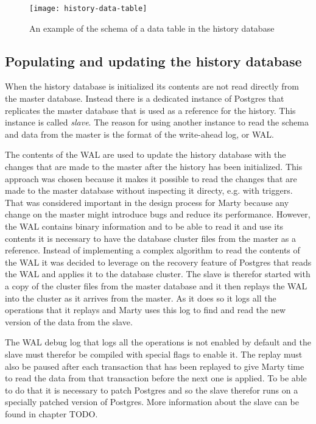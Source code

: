\begin{figure}[h!]
  \centering
    \texttt{[image: history-data-table]}
  \caption{An example of the schema of a data table in the history database}
  \label{history-data-table}
\end{figure}

\subsection{Populating and updating the history database}
When the history database is initialized its contents are not read directly from the master database.
Instead there is a dedicated instance of Postgres that replicates the master database that is used as a reference for the history.
This instance is called \textit{slave}.
The reason for using another instance to read the schema and data from the master is the format of the write-ahead log, or WAL.

The contents of the WAL are used to update the history database with the changes that are made to the master after the history has been initialized.
This approach was chosen because it makes it possible to read the changes that are made to the master database without inspecting it directy, e.g. with triggers.
That was considered important in the design process for Marty because any change on the master might introduce bugs and reduce its performance.
However, the WAL contains binary information and to be able to read it and use its contents it is necessary to have the database cluster files from the master as a reference.
Instead of implementing a complex algorithm to read the contents of the WAL it was decided to leverage on the recovery feature of Postgres that reads the WAL and applies it to the database cluster.
The slave is therefor started with a copy of the cluster files from the master database and it then replays the WAL into the cluster as it arrives from the master.
As it does so it logs all the operations that it replays and Marty uses this log to find and read the new version of the data from the slave.

The WAL debug log that logs all the operations is not enabled by default and the slave must therefor be compiled with special flags to enable it.
The replay must also be paused after each transaction that has been replayed to give Marty time to read the data from that transaction before the next one is applied.
To be able to do that it is necessary to patch Postgres and so the slave therefor runs on a specially patched version of Postgres.
More information about the slave can be found in chapter TODO.

